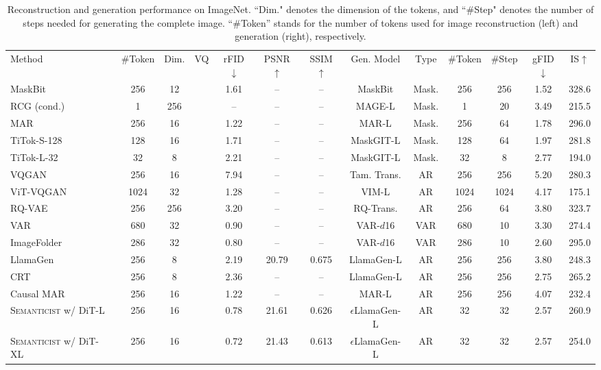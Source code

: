 \documentclass[10pt,twocolumn,letterpaper]{article}
\newcommand{\cmark}{\ding{51}}\newcommand{\xmark}{\ding{55}}
\newcommand{\tablestyle}[2]{\setlength{\tabcolsep}{#1}\renewcommand{\arraystretch}{#2}\centering\footnotesize}
\DeclareRobustCommand{\modelname}{\textsc{Semanticist}\xspace}
\DeclareRobustCommand{\armodelname}{$\epsilon$LlamaGen\xspace}
\begin{document}
\begin{table*}[t]
\centering 
\tablestyle{5.5pt}{1.05}
\begin{tabular}{l ccc |ccc | cccccc}
    Method & \#Token & Dim. & VQ & rFID$\downarrow$ & PSNR$\uparrow$ & SSIM$\uparrow$ & Gen. Model & Type & \#Token & \#Step & gFID$\downarrow$ & IS$\uparrow$ \\
    \shline
    MaskBit~\cite{maskbit} & 256 & 12 & \cmark & 1.61 & -- & -- & MaskBit & Mask. & 256 & 256 & 1.52 & 328.6 \\
    RCG (cond.)~\cite{RCG} & 1 & 256 & \xmark & -- & -- & -- & MAGE-L & Mask. & 1 & 20 & 3.49 & 215.5 \\
    MAR~\cite{mar} & 256 & 16 & \xmark & 1.22 & -- & -- & MAR-L & Mask. & 256 & 64 & 1.78 & 296.0 \\
    TiTok-S-128~\cite{titok} & 128 & 16 & \cmark & 1.71 & -- & -- & MaskGIT-L & Mask. & 128 & 64 & 1.97 & 281.8 \\
    TiTok-L-32~\cite{titok} & 32 & 8 & \cmark & 2.21 & -- & -- & MaskGIT-L & Mask. & 32 & 8 & 2.77 & 194.0 \\
    \hline
    VQGAN~\cite{VQGAN} & 256 & 16 & \cmark & 7.94 & -- & -- & Tam. Trans. & AR & 256 & 256 & 5.20 & 280.3 \\
    ViT-VQGAN~\cite{vitvqgan} & 1024 & 32 & \cmark & 1.28 & -- & -- & VIM-L & AR & 1024 & 1024 & 4.17 & 175.1  \\
    RQ-VAE~\cite{rqvae} & 256 & 256 & \cmark & 3.20 & -- & -- & RQ-Trans. & AR & 256 & 64 & 3.80 & 323.7 \\
    VAR~\cite{var}  & 680 & 32 & \cmark & 0.90 & -- & -- & VAR-$d$16 & VAR & 680 & 10 & 3.30 & 274.4 \\
    ImageFolder~\cite{imagefolder} & 286 & 32 & \cmark & 0.80 & -- & -- & VAR-$d$16 & VAR & 286 & 10 & 2.60 & 295.0\\
    LlamaGen~\cite{llamagen} & 256 & 8 & \cmark & 2.19 & 20.79 & 0.675 & LlamaGen-L & AR & 256 & 256 & 3.80 & 248.3 \\
    CRT~\cite{CRT} & 256 & 8 & \cmark & 2.36 & -- & -- & LlamaGen-L & AR & 256 & 256 & 2.75 & 265.2 \\
    Causal MAR~\cite{mar} & 256 & 16 & \xmark & 1.22 & -- & -- & MAR-L & AR & 256 & 256 & 4.07 & 232.4 \\
    \hline
    \modelname w/ DiT-L & 256 & 16 & \xmark &  0.78  & 21.61 & 0.626 & \armodelname-L & AR & 32 & 32 & 2.57 & 260.9  \\
    \modelname w/ DiT-XL & 256 & 16 & \xmark &  0.72 & 21.43 & 0.613 & \armodelname-L & AR & 32 & 32 & 2.57 & 254.0 \\
\end{tabular}
\vspace{-.5em}
\caption{Reconstruction and generation performance on ImageNet. ``Dim." denotes the dimension of the tokens, and ``\#Step" denotes the number of steps needed for generating the complete image. ``\#Token'' stands for the number of tokens used for image reconstruction (left) and generation (right), respectively.}\label{tab:tok_comp}
\end{table*}
\end{document}
